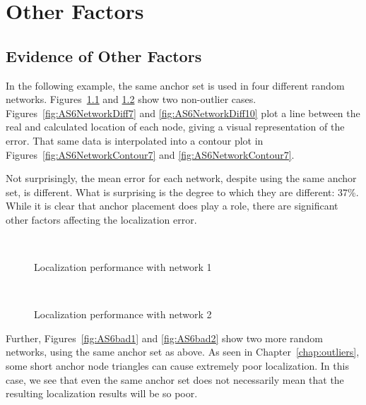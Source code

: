 \chapter{Other Factors}

\section{Evidence of Other Factors}
\label{sec:otherfactors}
In the following example, the same anchor set is used in four different random networks.  Figures~\ref{fig:AS6good1} and \ref{fig:AS6good2} show two non-outlier cases.  Figures~\ref{fig:AS6NetworkDiff7} and \ref{fig:AS6NetworkDiff10} plot a line between the real and calculated location of each node, giving a visual representation of the error.  That same data is interpolated into a contour plot in Figures~\ref{fig:AS6NetworkContour7} and \ref{fig:AS6NetworkContour7}.

Not surprisingly, the mean error for each network, despite using the same anchor set, is different.  What is surprising is the degree to which they are different: 37\%.  While it is clear that anchor placement does play a role, there are significant other factors affecting the localization error.

\begin{figure}
  \centering
\\
	\caption{Localization performance with network 1}
	\label{fig:AS6good1}		
\end{figure}
\begin{figure}
  \centering
\\
	\caption{Localization performance with network 2}
	\label{fig:AS6good2}
\end{figure}

Further, Figures~\ref{fig:AS6bad1} and \ref{fig:AS6bad2} show two more random networks, using the same anchor set as above.  As seen in Chapter~\ref{chap:outliers}, some short anchor node triangles can cause extremely poor localization.  In this case, we see that even the same anchor set does not necessarily mean that the resulting localization results will be so poor.  

